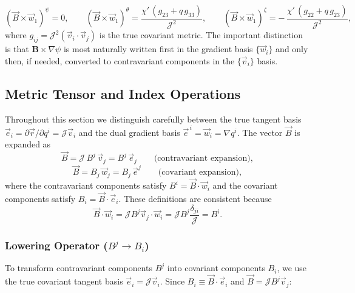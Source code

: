 \documentclass[10pt,a4paper]{article}
\numberwithin{equation}{section}
\begin{document}
\begin{equation}
(\vec{B} \times \vec{w}_1)^\psi = 0, \qquad
(\vec{B} \times \vec{w}_1)^\theta = \frac{\chi'\,(g_{23}+q\,g_{33})}{\mathcal{J}^{2}}, \qquad
(\vec{B} \times \vec{w}_1)^\zeta = -\,\frac{\chi'\,(g_{22}+q\,g_{23})}{\mathcal{J}^{2}},
\end{equation}
where $g_{ij}=\mathcal J^2(\vec v_i\cdot\vec v_j)$ is the true covariant
metric.  The important distinction is that $\mathbf B\times\nabla\psi$ is most
naturally written first in the gradient basis $\{\vec w_i\}$ and only then, if
needed, converted to contravariant components in the $\{\vec v_i\}$ basis.

\subsection{Metric Tensor and Index Operations}

Throughout this section we distinguish carefully between the true tangent basis
$\vec e_i=\partial\vec r/\partial q^i=\mathcal J\vec v_i$ and the dual gradient
basis $\vec e^{\,i}=\vec w_i=\nabla q^i$.  The vector $\vec B$ is expanded as
\begin{equation}
    \vec{B} = \mathcal{J}\,B^j\,\vec{v}_j = B^j\,\vec{e}_j
    \qquad\text{(contravariant expansion)},
\end{equation}
\begin{equation}
    \vec{B} = B_j\,\vec{w}_j = B_j\,\vec{e}^j
    \qquad\text{(covariant expansion)},
\end{equation}
where the contravariant components satisfy
$B^i = \vec{B}\cdot\vec{w}_i$ and the covariant components satisfy
$B_i = \vec{B}\cdot\vec{e}_i$.  These definitions are consistent because
\begin{equation}
\vec{B}\cdot\vec{w}_i
= \mathcal{J} B^j \vec{v}_j\cdot\vec{w}_i
= \mathcal{J} B^j \frac{\delta_{ji}}{\mathcal J}
= B^i.
\end{equation}

\subsubsection{Lowering Operator ($B^j \to B_i$)}
To transform contravariant components $B^j$ into covariant components $B_i$, we use the true covariant tangent basis $\vec{e}_i = \mathcal{J}\vec{v}_i$.
Since $B_i \equiv \vec{B}\cdot\vec{e}_i$ and $\vec{B} = \mathcal{J}B^j\vec{v}_j$:
\end{document}
